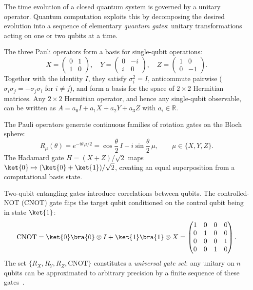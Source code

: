 The time evolution of a closed quantum system is governed by a unitary operator.
Quantum computation exploits this by decomposing the desired evolution into a
sequence of elementary \emph{quantum gates}: unitary transformations acting on one
or two qubits at a time.

The three Pauli operators form a basis for single-qubit operations:
\begin{equation}
  \label{eq:pauli}
  X = \begin{pmatrix} 0 & 1 \\ 1 & 0 \end{pmatrix},\quad
  Y = \begin{pmatrix} 0 & -i \\ i & 0 \end{pmatrix},\quad
  Z = \begin{pmatrix} 1 & 0 \\ 0 & -1 \end{pmatrix}.
\end{equation}
Together with the identity $I$, they satisfy $\sigma_i^2 = I$, anticommute
pairwise ($\sigma_i\sigma_j = -\sigma_j\sigma_i$ for $i\neq j$), and form a
basis for the space of $2\times 2$ Hermitian matrices. Any $2\times 2$ Hermitian
operator, and hence any single-qubit observable, can be written as
$A = a_0 I + a_1 X + a_2 Y + a_3 Z$ with $a_i\in\mathbb{R}$.

The Pauli operators generate continuous families of rotation gates on the Bloch
sphere:
\begin{equation}
  \label{eq:rotations}
  R_\mu(\theta) = e^{-i\theta\,\mu/2}
    = \cos\frac{\theta}{2}\,I - i\sin\frac{\theta}{2}\,\mu,
  \qquad \mu \in \{X,Y,Z\}.
\end{equation}
The Hadamard gate $H = (X+Z)/\sqrt{2}$ maps $\ket{0}\mapsto(\ket{0}+\ket{1})/\sqrt{2}$,
creating an equal superposition from a computational basis state.

Two-qubit entangling gates introduce correlations between qubits. The
controlled-NOT (CNOT) gate flips the target qubit conditioned on the control
qubit being in state $\ket{1}$:
\begin{equation}
  \label{eq:cnot}
  \text{CNOT} = \ket{0}\bra{0}\otimes I + \ket{1}\bra{1}\otimes X
  = \begin{pmatrix}
    1 & 0 & 0 & 0 \\
    0 & 1 & 0 & 0 \\
    0 & 0 & 0 & 1 \\
    0 & 0 & 1 & 0
  \end{pmatrix}.
\end{equation}
The set $\{R_X,R_Y,R_Z,\text{CNOT}\}$ constitutes a \emph{universal gate set}:
any unitary on $n$ qubits can be approximated to arbitrary precision by a finite
sequence of these gates~\cite{nielsen2010}.


